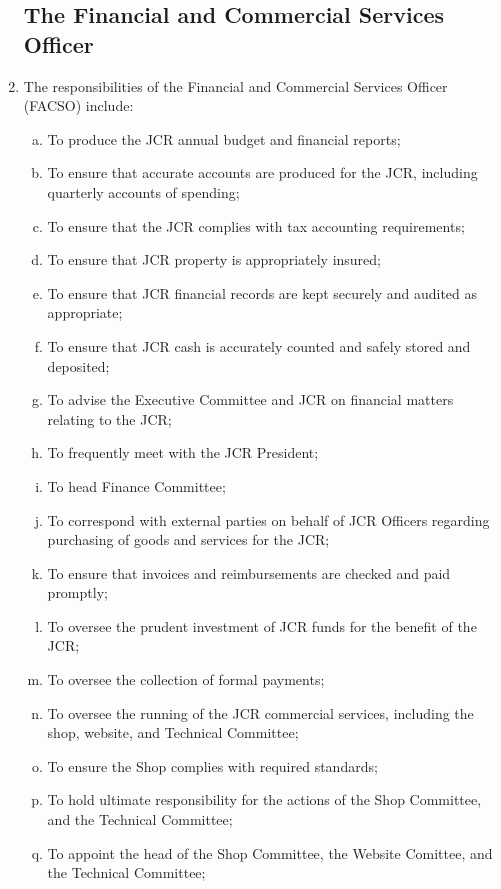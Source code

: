\documentclass[12pt]{article}
\begin{document}
\begin{enumerate}
    \subsection{The Financial and Commercial Services Officer}
    \item The responsibilities of the Financial and Commercial Services Officer (FACSO) include:
    \begin{enumerate}[(a)]
        \item To produce the JCR annual budget and financial reports;
        \item To ensure that accurate accounts are produced for the JCR, including quarterly accounts of spending;
        \item To ensure that the JCR complies with tax accounting requirements;
        \item To ensure that JCR property is appropriately insured;
        \item To ensure that JCR financial records are kept securely and audited as appropriate;
        \item To ensure that JCR cash is accurately counted and safely stored and deposited;
        \item To advise the Executive Committee and JCR on financial matters relating to the JCR;
        \item To frequently meet with the JCR President;
        \item To head Finance Committee;
        \item To correspond with external parties on behalf of JCR Officers regarding purchasing of goods and services for the JCR;
        \item To ensure that invoices and reimbursements are checked and paid promptly;
        \item To oversee the prudent investment of JCR funds for the benefit of the JCR;
        \item To oversee the collection of formal payments;
        \item To oversee the running of the JCR commercial services, including the shop, website, and Technical Committee;
        \item To ensure the Shop complies with required standards;
        \item To hold ultimate responsibility for the actions of the Shop Committee, and the Technical Committee;
        \item To appoint the head of the Shop Committee, the Website Comittee, and the Technical Committee;

\end{enumerate}
\end{enumerate}
\end{document}

